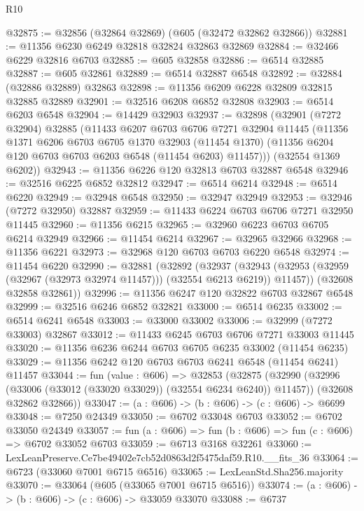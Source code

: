 \begin{lexlean}{R10}
\begin{coremodule}
@32875 := @32856 (@32864 @32869) (@605 (@32472 @32862 @32866))
@32881 := @11356 @6230 @6249 @32818 @32824 @32863 @32869
@32884 := @32466 @6229 @32816 @6703
@32885 := @605 @32858
@32886 := @6514 @32885
@32887 := @605 @32861
@32889 := @6514 @32887 @6548
@32892 := @32884 (@32886 @32889) @32863
@32898 := @11356 @6209 @6228 @32809 @32815 @32885 @32889
@32901 := @32516 @6208 @6852 @32808
@32903 := @6514 @6203 @6548
@32904 := @14429 @32903
@32937 := @32898
    (@32901
      (@7272 @32904)
      @32885
      (@11433
        @6207
        @6703
        @6706
        @7271
        @32904
        @11445
        (@11356
          @1371
          @6206
          @6703
          @6705
          @1370
          @32903
          (@11454 @1370)
          (@11356 @6204 @120 @6703 @6703 @6203 @6548 (@11454 @6203) @11457)))
      (@32554 @1369 @6202))
@32943 := @11356 @6226 @120 @32813 @6703 @32887 @6548
@32946 := @32516 @6225 @6852 @32812
@32947 := @6514 @6214
@32948 := @6514 @6220
@32949 := @32948 @6548
@32950 := @32947 @32949
@32953 := @32946 (@7272 @32950) @32887
@32959 := @11433 @6224 @6703 @6706 @7271 @32950 @11445
@32960 := @11356 @6215
@32965 := @32960 @6223 @6703 @6705 @6214 @32949
@32966 := @11454 @6214
@32967 := @32965 @32966
@32968 := @11356 @6221
@32973 := @32968 @120 @6703 @6703 @6220 @6548
@32974 := @11454 @6220
@32990 := @32881
    (@32892
      (@32937
        (@32943 (@32953 (@32959 (@32967 (@32973 @32974 @11457))) (@32554 @6213 @6219)) @11457))
      (@32608 @32858 @32861))
@32996 := @11356 @6247 @120 @32822 @6703 @32867 @6548
@32999 := @32516 @6246 @6852 @32821
@33000 := @6514 @6235
@33002 := @6514 @6241 @6548
@33003 := @33000 @33002
@33006 := @32999 (@7272 @33003) @32867
@33012 := @11433 @6245 @6703 @6706 @7271 @33003 @11445
@33020 := @11356 @6236 @6244 @6703 @6705 @6235 @33002 (@11454 @6235)
@33029 := @11356 @6242 @120 @6703 @6703 @6241 @6548 (@11454 @6241) @11457
@33044 := fun (value : @606) =>
  @32853
    (@32875
      (@32990 (@32996 (@33006 (@33012 (@33020 @33029)) (@32554 @6234 @6240)) @11457))
      (@32608 @32862 @32866))
@33047 := (a : @606) -> (b : @606) -> (c : @606) -> @6699
@33048 := @7250 @24349
@33050 := @6702 @33048 @6703
@33052 := @6702 @33050 @24349
@33057 := fun (a : @606) => fun (b : @606) => fun (c : @606) => @6702 @33052 @6703
@33059 := @6713 @3168 @32261
@33060 := LexLeanPreserve.Ce7be49402e7cb52d0863d2f5475daf59.R10.__fits_36
@33064 := @6723 (@33060 @7001 @6715 @6516)
@33065 := LexLeanStd.Sha256.majority
@33070 := @33064 (@605 (@33065 @7001 @6715 @6516))
@33074 := (a : @606) -> (b : @606) -> (c : @606) -> @33059 @33070
@33088 := @6737

\end{coremodule}
\end{lexlean}
